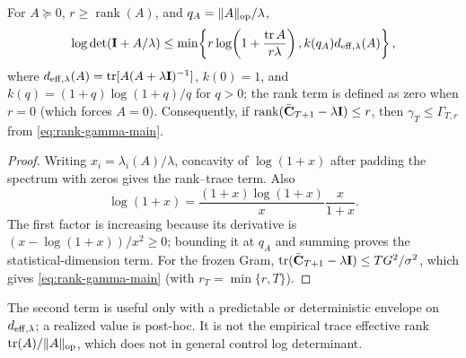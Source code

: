 \begin{lemma}\label{lem:rank-logdet}
For $A\succeq0$, $r\ge\operatorname{rank}(A)$, and
$q_A=\|A\|_{\rm op}/\lambda$,
\begin{equation}\label{eq:rank-logdet}
\log\det(\mathbf{I}+A/\lambda)\le
\min\!\left\{r\log\!\left(1+\frac{\operatorname{tr}A}{r\lambda}\right),
 k(q_A)d_{{\rm eff},\lambda}(A)\right\},
\end{equation}
where $d_{{\rm eff},\lambda}(A)=\operatorname{tr}[A(A+\lambda\mathbf{I})^{-1}]$,
$k(0)=1$, and $k(q)=(1+q)\log(1+q)/q$ for $q>0$; the rank term is defined
as zero when $r=0$ (which forces $A=0$).  Consequently, if
$\operatorname{rank}(\bar{\mathbf{C}}_{T+1}-\lambda\mathbf{I})\le r$, then
$\gamma_T\le\Gamma_{T,r}$ from \eqref{eq:rank-gamma-main}.
\end{lemma}
\begin{proof}
Writing $x_i=\lambda_i(A)/\lambda$, concavity of $\log(1+x)$ after padding
the spectrum with zeros gives the rank--trace term.  Also
\[
 \log(1+x)=\frac{(1+x)\log(1+x)}x\frac{x}{1+x}.
\]
The first factor is increasing because its derivative is
$(x-\log(1+x))/x^2\ge0$; bounding it at $q_A$ and summing proves the
statistical-dimension term.  For the frozen Gram,
$\operatorname{tr}(\bar{\mathbf{C}}_{T+1}-\lambda\mathbf{I})\le TG^2/\sigma^2$, which gives
\eqref{eq:rank-gamma-main} (with $r_T=\min\{r,T\}$).
\end{proof}
The second term is useful only with a predictable or deterministic envelope on
$d_{{\rm eff},\lambda}$; a realized value is post-hoc.  It is not the empirical
trace effective rank $\operatorname{tr}(A)/\|A\|_{\rm op}$, which does not in
general control log determinant.

